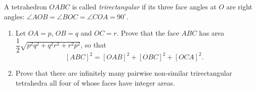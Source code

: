 A tetrahedron $OABC$ is called \emph{trirectangular} if its three face angles at $O$ are right angles: $\angle AOB=\angle BOC=\angle COA=90^\circ$.
\begin{enumerate}
\item[(a)] Let $OA=p$, $OB=q$ and $OC=r$. Prove that the face $ABC$ has area $\dfrac12\sqrt{p^2q^2+q^2r^2+r^2p^2}$, so that
\[[ABC]^2=[OAB]^2+[OBC]^2+[OCA]^2.\]
\item[(b)] Prove that there are infinitely many pairwise non-similar trirectangular tetrahedra all four of whose faces have integer areas.
\end{enumerate}

